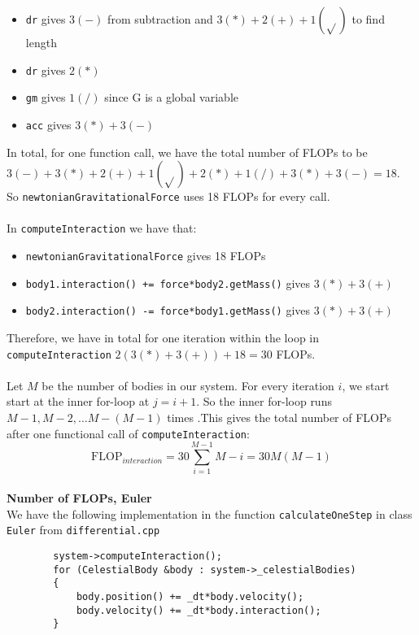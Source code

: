 \documentclass[12pt]{article}
\begin{document}
	 \begin{itemize}
	 	\item \texttt{dr} gives $3(-)$ from subtraction and $3(*) + 2(+) +1(\sqrt{})$ to find length
	 	\item \texttt{dr} gives $2(*)$
	 	\item \texttt{gm} gives $1(/)$ since G is a global variable
	 	\item \texttt{acc} gives $3(*)+ 3(-)$
	 \end{itemize}
	   In total, for one function call, we have the total number of FLOPs to be $3(-)+3(*) + 2(+) +1(\sqrt{})+ 2(*)+1(/)+3(*)+ 3(-) = 18 $. \\
	So \texttt{newtonianGravitationalForce} uses 18 FLOPs for every call. \\ \hfill \\ In \texttt{computeInteraction} we have that:
	\begin{itemize}
		\item \texttt{newtonianGravitationalForce}  gives 18 FLOPs
		\item \texttt{body1.interaction() += force*body2.getMass()} gives $3(*) + 3(+)$ 
		\item \texttt{body2.interaction() -= force*body1.getMass()} gives $3(*) + 3(+)$ 
	\end{itemize} 
	Therefore, we have in total for one iteration within the loop in \texttt{computeInteraction}  $2(3(*) + 3(+)) + 18 = 30$  FLOPs.  \\ \hfill \\
	Let $M$ be the number of bodies in our system. For every iteration $i$, we start start at the inner for-loop at $j = i +1$. So the inner for-loop runs $M-1, M-2 ,\dots M-(M-1)$ times .This gives the total number of FLOPs after one functional call of \texttt{computeInteraction}:
	\begin{equation} \label{eq:flop}
				\text{FLOP}_{interaction} = 30\sum_{i = 1}^{M-1} M-i = 30M(M-1) 
	\end{equation} \hfill \\
	 \textbf{Number of FLOPs, Euler} \\ We have the following implementation in the function \texttt{calculateOneStep} in class \texttt{Euler} from \texttt{differential.cpp}
	 \begin{lstlisting}
	 	system->computeInteraction();
	 	for (CelestialBody &body : system->_celestialBodies)
	 	{
		 	body.position() += _dt*body.velocity();
		 	body.velocity() += _dt*body.interaction();
	 	}
	 \end{lstlisting}
\end{document}
